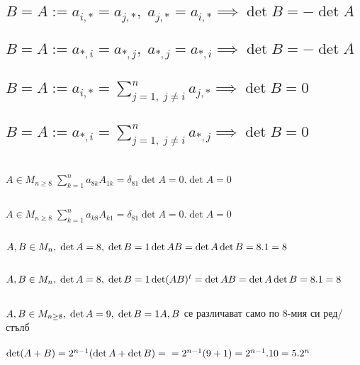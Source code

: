 \documentclass{article}
\begin{document}
    \subsection{\(B = A := a_{i,*} = a_{j,*}, \; a_{j,*} = a_{i,*}  \implies \det B = -\det A\)}
    \subsection{\(B = A := a_{*,i} = a_{*,j}, \; a_{*,j} = a_{*,i}  \implies \det B = -\det A\)}
    \subsection{\(B = A := a_{i,*} = \displaystyle\sum_{j = 1, \; j \neq i}^n a_{j,*} \implies \det B = 0\)}
    \subsection{\(B = A := a_{*,i} = \displaystyle\sum_{j = 1, \; j \neq i}^n a_{*,j} \implies \det B = 0\)}
    \section{}
    \subsection{}
    \(A \in M_{n \geq 8} \; \displaystyle\sum_{k = 1}^n a_{8k}A_{1k} = \delta_{81}\det A = 0.\det A = 0\)
    \subsection{}
    \(A \in M_{n \geq 8} \; \displaystyle\sum_{k = 1}^n a_{k8}A_{k1} = \delta_{81}\det A = 0.\det A = 0\)
    \subsection{}
    \(A, B \in M_n, \; \det A = 8, \; \det B = 1 \\\\ \det AB = \det A\det B = 8.1 = 8\)
    \subsection{}
    \(A, B \in M_n, \; \det A = 8, \; \det B = 1 \\\\ \det(AB)^t = \det AB = \det A\det B = 8.1 = 8\)
    \subsection{}
    \(A, B \in M_{n \geq 8}, \; \det A = 9, \; \det B = 1 \\\\ A, B \) се различават само по 8-мия си ред/стълб \\\\
    \(\det(A + B) = 2^{n - 1}(\det A + \det B) = \\\\ =2^{n - 1}(9 + 1) = 2^{n - 1}.10 = 5.2^n\)
\end{document}
